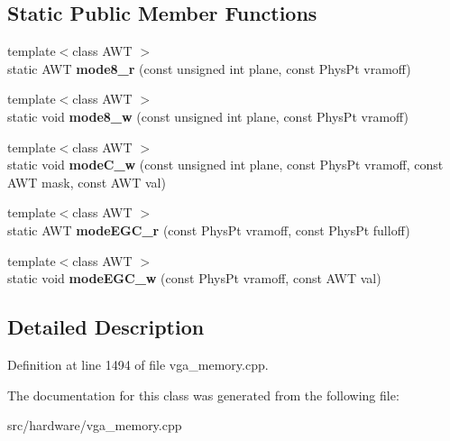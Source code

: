 \subsection*{Static Public Member Functions}
\begin{DoxyCompactItemize}
\item 
\hypertarget{classVGA__PC98__PageHandler_a258b7ab8e0bf52a16e15c16ab0811670}{{\footnotesize template$<$class A\-W\-T $>$ }\\static A\-W\-T {\bfseries mode8\-\_\-r} (const unsigned int plane, const Phys\-Pt vramoff)}\label{classVGA__PC98__PageHandler_a258b7ab8e0bf52a16e15c16ab0811670}

\item 
\hypertarget{classVGA__PC98__PageHandler_a64b218e643644a33e0c298622dbe72b9}{{\footnotesize template$<$class A\-W\-T $>$ }\\static void {\bfseries mode8\-\_\-w} (const unsigned int plane, const Phys\-Pt vramoff)}\label{classVGA__PC98__PageHandler_a64b218e643644a33e0c298622dbe72b9}

\item 
\hypertarget{classVGA__PC98__PageHandler_ad50a2f65155811c9398c8c17ccf65fb1}{{\footnotesize template$<$class A\-W\-T $>$ }\\static void {\bfseries mode\-C\-\_\-w} (const unsigned int plane, const Phys\-Pt vramoff, const A\-W\-T mask, const A\-W\-T val)}\label{classVGA__PC98__PageHandler_ad50a2f65155811c9398c8c17ccf65fb1}

\item 
\hypertarget{classVGA__PC98__PageHandler_a12e4eba4a8b70a108fa7623c3333043e}{{\footnotesize template$<$class A\-W\-T $>$ }\\static A\-W\-T {\bfseries mode\-E\-G\-C\-\_\-r} (const Phys\-Pt vramoff, const Phys\-Pt fulloff)}\label{classVGA__PC98__PageHandler_a12e4eba4a8b70a108fa7623c3333043e}

\item 
\hypertarget{classVGA__PC98__PageHandler_a09fd8d229bb9bd98e5d856fdbf6a13eb}{{\footnotesize template$<$class A\-W\-T $>$ }\\static void {\bfseries mode\-E\-G\-C\-\_\-w} (const Phys\-Pt vramoff, const A\-W\-T val)}\label{classVGA__PC98__PageHandler_a09fd8d229bb9bd98e5d856fdbf6a13eb}

\end{DoxyCompactItemize}


\subsection{Detailed Description}


Definition at line 1494 of file vga\-\_\-memory.\-cpp.



The documentation for this class was generated from the following file\-:\begin{DoxyCompactItemize}
\item 
src/hardware/vga\-\_\-memory.\-cpp\end{DoxyCompactItemize}

